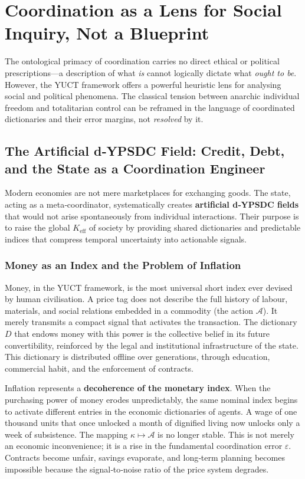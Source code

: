 \documentclass[12pt,a4paper]{article}
\begin{document}
	\section{Coordination as a Lens for Social Inquiry, Not a Blueprint}
	\label{sec:social-lens}
	
	The ontological primacy of coordination carries no direct ethical or political prescriptions---a description of what \emph{is} cannot logically dictate what \emph{ought to be}. However, the YUCT framework offers a powerful heuristic lens for analysing social and political phenomena. The classical tension between anarchic individual freedom and totalitarian control can be reframed in the language of coordinated dictionaries and their error margins, not \emph{resolved} by it.
	
	
	\subsection{The Artificial d‑YPSDC Field: Credit, Debt, and the State as a Coordination Engineer}
	
	Modern economies are not mere marketplaces for exchanging goods. The state, acting as a meta‑coordinator, systematically creates \textbf{artificial d‑YPSDC fields} that would not arise spontaneously from individual interactions. Their purpose is to raise the global \(K_{\mathrm{eff}}\) of society by providing shared dictionaries and predictable indices that compress temporal uncertainty into actionable signals.
	
	\subsubsection{Money as an Index and the Problem of Inflation}
	
	Money, in the YUCT framework, is the most universal short index ever devised by human civilisation. A price tag does not describe the full history of labour, materials, and social relations embedded in a commodity (the action \(\mathcal{A}\)). It merely transmits a compact signal that activates the transaction. The dictionary \(D\) that endows money with this power is the collective belief in its future convertibility, reinforced by the legal and institutional infrastructure of the state. This dictionary is distributed offline over generations, through education, commercial habit, and the enforcement of contracts.
	
	Inflation represents a \textbf{decoherence of the monetary index}. When the purchasing power of money erodes unpredictably, the same nominal index begins to activate different entries in the economic dictionaries of agents. A wage of one thousand units that once unlocked a month of dignified living now unlocks only a week of subsistence. The mapping \(\kappa \mapsto \mathcal{A}\) is no longer stable. This is not merely an economic inconvenience; it is a rise in the fundamental coordination error \(\varepsilon\). Contracts become unfair, savings evaporate, and long‑term planning becomes impossible because the signal‑to‑noise ratio of the price system degrades.
	
\end{document}
